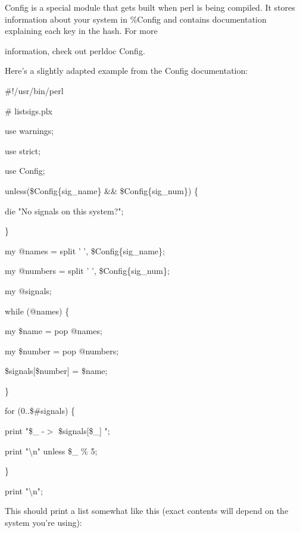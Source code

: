 \documentclass[a4paper,11pt]{book}
\begin{document}
\noindent 

\noindent Config is a special module that gets built when perl is being compiled. It stores information about your system in \%Config and contains documentation explaining each key in the hash. For more

\noindent information, check out perldoc Config.

\noindent 

\noindent Here's a slightly adapted example from the Config documentation:

\noindent 

\noindent 

\noindent \#!/usr/bin/perl

\noindent \# listsigs.plx

\noindent use warnings;

\noindent use strict;

\noindent use Config;

\noindent unless(\$Config\{sig\_name\} \&\& \$Config\{sig\_num\}) \{

\noindent die "No signals on this system?";

\noindent \}

\noindent 

\noindent my @names = split ' ', \$Config\{sig\_name\};

\noindent my @numbers = split ' ', \$Config\{sig\_num\};

\noindent my @signals;

\noindent 

\noindent while (@names) \{

\noindent my \$name = pop @names;

\noindent my \$number = pop @numbers;

\noindent \$signals[\$number] = \$name;

\noindent \}

\noindent for (0..\$\#signals) \{

\noindent print "\$\_  -$>$ \$signals[\$\_]  ";

\noindent print "\textbackslash n" unless \$\_  \% 5;

\noindent \}

\noindent print "\textbackslash n";

\noindent 

\noindent 

\noindent This should print a list somewhat like this (exact contents will depend on the system you're using):
\end{document}
